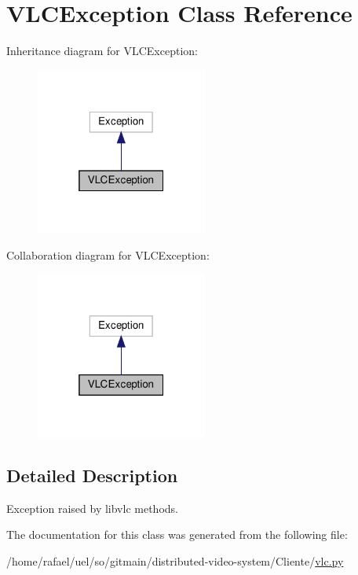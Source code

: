 \hypertarget{classvlc_1_1_v_l_c_exception}{}\section{V\+L\+C\+Exception Class Reference}
\label{classvlc_1_1_v_l_c_exception}


Inheritance diagram for V\+L\+C\+Exception\+:
\nopagebreak
\begin{figure}[H]
\begin{center}
\leavevmode
\includegraphics[width=160pt]{classvlc_1_1_v_l_c_exception__inherit__graph}
\end{center}
\end{figure}


Collaboration diagram for V\+L\+C\+Exception\+:
\nopagebreak
\begin{figure}[H]
\begin{center}
\leavevmode
\includegraphics[width=160pt]{classvlc_1_1_v_l_c_exception__coll__graph}
\end{center}
\end{figure}


\subsection{Detailed Description}
\begin{DoxyVerb}Exception raised by libvlc methods.
\end{DoxyVerb}
 

The documentation for this class was generated from the following file\+:\begin{DoxyCompactItemize}
\item 
/home/rafael/uel/so/gitmain/distributed-\/video-\/system/\+Cliente/\hyperlink{vlc_8py}{vlc.\+py}\end{DoxyCompactItemize}
